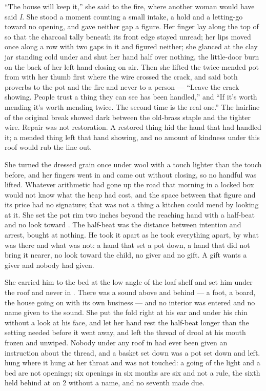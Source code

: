 “The house will keep it,” she said to the fire, where another woman would have said \emph{I}. She stood a moment counting a small intake, a hold and a letting-go toward no opening, and gave neither gap a figure. Her finger lay along the top of  so that the charcoal tally beneath its front edge stayed unread; her lips moved once along a row with two gaps in it and figured neither; she glanced at the clay jar standing cold under  and shut her hand half over nothing, the little-door burn on the back of her left hand closing on air. Then she lifted the twice-mended pot from  with her thumb first where the wire crossed the crack, and said both proverbs to the pot and the fire and never to a person --- “Leave the crack showing. People trust a thing they can see has been handled,” and “If it's worth mending it's worth mending twice. The second time is the real one.” The hairline of the original break showed dark between the old-brass staple and the tighter wire. Repair was not restoration. A restored thing hid the hand that had handled it; a mended thing left that hand showing, and no amount of kindness under this roof would rub the line out.

She turned the dressed grain once under wool with a touch lighter than the touch before, and her fingers went in and came out without closing, so no handful was lifted. Whatever arithmetic had gone up the road that morning in a locked box would not know what the heap had cost, and the space between that figure and its price had no signature; that was not a thing a kitchen could mend by looking at it. She set the pot rim two inches beyond the reaching hand with a half-beat and no look toward . The half-beat was the distance between intention and arrest, bought at nothing. He took it apart as he took everything apart, by what was there and what was not: a hand that set a pot down, a hand that did not bring it nearer, no look toward the child, no giver and no gift. A gift wants a giver and nobody had given.

She carried him to the bed at the low angle of the loaf shelf and set him under the roof and never in . There was a sound above and behind --- a foot, a board, the house going on with its own business --- and no interior was entered and no name given to the sound. She put the fold right at his ear and under his chin without a look at his face, and let her hand rest the half-beat longer than the setting needed before it went away, and left the thread of drool at his mouth frozen and unwiped. Nobody under any roof in  had ever been given an instruction about the thread, and a basket set down was a pot set down and left.  hung where it hung at her throat and was not touched: a going of the light and a bed are not openings; six openings in six months are six and not a rule, the sixth held behind at  on  2 without a name, and no seventh made due.

